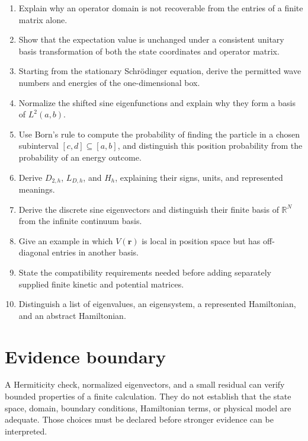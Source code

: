 \begin{enumerate}
  \item Explain why an operator domain is not recoverable from the entries of a
        finite matrix alone.
  \item Show that the expectation value is unchanged under a consistent unitary
        basis transformation of both the state coordinates and operator matrix.
  \item Starting from the stationary Schrödinger equation, derive the permitted
        wave numbers and energies of the one-dimensional box.
  \item Normalize the shifted sine eigenfunctions and explain why they form a
        basis of \(L^2(a,b)\).
  \item Use Born's rule to compute the probability of finding the particle in a
        chosen subinterval \([c,d]\subseteq[a,b]\), and distinguish this
        position probability from the probability of an energy outcome.
  \item Derive \(D_{2,h}\), \(L_{D,h}\), and \(H_h\), explaining their signs,
        units, and represented meanings.
  \item Derive the discrete sine eigenvectors and distinguish their finite basis
        of \(\mathbb R^N\) from the infinite continuum basis.
  \item Give an example in which \(V(\mathbf r)\) is local in position space but
        has off-diagonal entries in another basis.
  \item State the compatibility requirements needed before adding separately
        supplied finite kinetic and potential matrices.
  \item Distinguish a list of eigenvalues, an eigensystem, a represented
        Hamiltonian, and an abstract Hamiltonian.
\end{enumerate}

\section{Evidence boundary}

A Hermiticity check, normalized eigenvectors, and a small residual can verify
bounded properties of a finite calculation. They do not establish that the
state space, domain, boundary conditions, Hamiltonian terms, or physical model
are adequate. Those choices must be declared before stronger evidence can be
interpreted.
